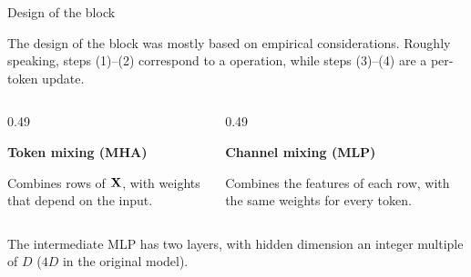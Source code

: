 \begin{frame}{Design of the block}
    \setlength{\parskip}{6pt}

    The design of the block was mostly based on empirical considerations.
    Roughly speaking, steps (1)--(2) correspond to a 
    operation, while steps (3)--(4) are a per-token update.

    \begin{columns}[T,onlytextwidth]
        \begin{column}{0.49\textwidth}
            \begin{tcolorbox}[nndsblue,courseheight={tf-mixing}{0.27\textheight}]
                \textbf{\color{darkcerulean}Token mixing (MHA)}

                Combines rows of $\boldsymbol{\mathbf{X}}$, with weights that depend on the input.
            \end{tcolorbox}
        \end{column}
        \begin{column}{0.49\textwidth}
            \begin{tcolorbox}[nndsgreen,courseheight={tf-mixing}{0.27\textheight}]
                \textbf{\color{darkgreen}Channel mixing (MLP)}

                Combines the features of each row, with the same weights for every token.
            \end{tcolorbox}
        \end{column}
    \end{columns}

    \medskip
    The intermediate
    MLP has two layers, with hidden dimension an integer multiple of $D$
    ($4D$ in the original model).


\end{frame}

